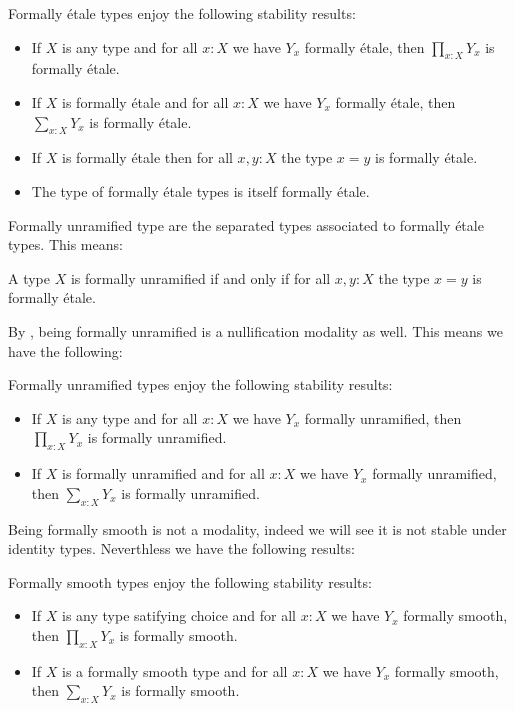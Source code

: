 \begin{proposition}
Formally étale types enjoy the following stability results:
\begin{itemize}
\item If $X$ is any type and for all $x:X$ we have $Y_x$ formally étale, then $\prod_{x:X}Y_x$ is formally étale. 
\item  If $X$ is formally étale and for all $x:X$ we have $Y_x$ formally étale, then $\sum_{x:X}Y_x$ is formally étale. 
\item If $X$ is formally étale then for all $x,y : X$ the type $x=y$ is formally étale.
\item The type of formally étale types is itself formally étale.
\end{itemize}
\end{proposition}

Formally unramified type are the separated types \cite[Definition 2.13]{localization} associated to formally étale types. This means:

\begin{lemma}
A type $X$ is formally unramified if and only if for all $x,y:X$ the type $x=y$ is formally étale.
\end{lemma}

By \cite[Lemma 2.15]{localization}, being formally unramified is a nullification modality as well. This means we have the following:

\begin{proposition}
Formally unramified types enjoy the following stability results:
\begin{itemize}
\item If $X$ is any type and for all $x:X$ we have $Y_x$ formally unramified, then $\prod_{x:X}Y_x$ is formally unramified. 
\item If $X$ is formally unramified and for all $x:X$ we have $Y_x$ formally unramified, then $\sum_{x:X}Y_x$ is formally unramified.
\end{itemize}
\end{proposition}

Being formally smooth is not a modality, indeed we will see it is not stable under identity types. Neverthless we have the following results:

\begin{lemma}\label{smooth-sigma-closed}
Formally smooth types enjoy the following stability results:
\begin{itemize}
\item If $X$ is any type satifying choice and for all $x:X$ we have $Y_x$ formally smooth, then $\prod_{x:X}Y_x$ is formally smooth.
\item If $X$ is a formally smooth type and for all $x:X$ we have $Y_x$ formally smooth, then $\sum_{x:X}Y_x$ is formally smooth.
\end{itemize}
\end{lemma}


